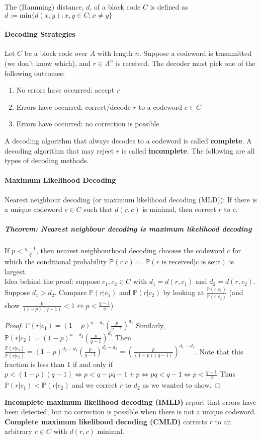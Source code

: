 \documentclass[10pt,letter]{article}
\theoremstyle{plain}
\theoremstyle{definition}
\begin{document}
The (Hamming) distance, $d$, of a block code $C$ is defined as $d:=\text{min}\{d(x,y):x,y\in C;x\neq y\}$

\paragraph{Decoding Strategies}
Let $C$ be a block code over $A$ with length $n$. Suppose a codeword is trasnmitted (we don't know which), and $r\in A^n$ is received. The decoder must pick one of the following outcomes: \begin{enumerate}
    \item No errors have occurred: accept $r$ 
    \item Errors have occurred: correct/decode $r$ to a codeword $c\in C$ 
    \item Errors have occurred: no correction is possible 
\end{enumerate}
A decoding algorithm that always decodes to a codeword is called \textbf{complete}. A decoding algorithm that may reject $r$ is called \textbf{incomplete}. The following are all types of decoding methods. 

\paragraph{Maximum Likelihood Decoding}
Nearest neighbour decoding (or maximum likelihood decoding (MLD)): If there is a unique codeword $c\in C$ such that $d(r,c)$ is minimal, then correct $r$ to $c$. 
\subparagraph{Theorem: Nearest neighbour decoding is maximum likelihood decoding} If $p<\frac{q-1}{q}$, then nearest neighbourhood decoding chooses the codeword $c$ for which the conditional probability $\mathbb{P}(r|c):=\mathbb{P}(r\text{ is received}|c\text{ is sent})$ is largest.  \\ 
Idea behind the proof: suppose $c_1,c_2\in C$ with $d_1=d(r,c_1)$ and $d_2=d(r,c_2)$. Suppose $d_1>d_2$. Compare $\mathbb{P}(r|c_1)$ and $\mathbb{P}(r|c_2)$ by looking at $\frac{\mathbb{P}(r|c_1)}{\mathbb{P}(r|c_2)}$ (and show $\frac{p}{(1-p)(q-1)}<1\Leftrightarrow p<\frac{q-1}{q}$)
\begin{proof}
$\mathbb{P}(r|c_1)=(1-p)^{n-d_1}\left(\frac{p}{q-1}\right)^{d_1}$ Similarly, \\ $\mathbb{P}(r|c_2)=(1-p)^{n-d_2}\left(\frac{p}{q-1}\right)^{d_2}$ Then \\ $\frac{\mathbb{P}(r|c_1)}{\mathbb{P}(r|c_2)}=(1-p)^{d_2-d_1}\left(\frac{p}{q-1}\right)^{d_1-d_2}=\left(\frac{p}{(1-p)(q-1)}\right)^{d_1-d_2}$. Note that this fraction is less than 1 if and only if $p<(1-p)(q-1)\Leftrightarrow p<q-pq-1+p\Leftrightarrow pq<q-1\Leftrightarrow p<\frac{q-1}{q}$ Thus $\mathbb{P}(r|c_1)<\mathbb{P}(r|c_2)$ and we correct $r$ to $d_2$ as we wanted to show. 
\end{proof}
\textbf{Incomplete maximum likelihood decoding (IMLD)} report that errors have been detected, but no correction is possible when there is not a unique codeword. \textbf{Complete maximum likelihood decoding (CMLD)} corrects $r$ to an arbitrary $c\in C$ with $d(r,c)$ minimal.  
\end{document}
